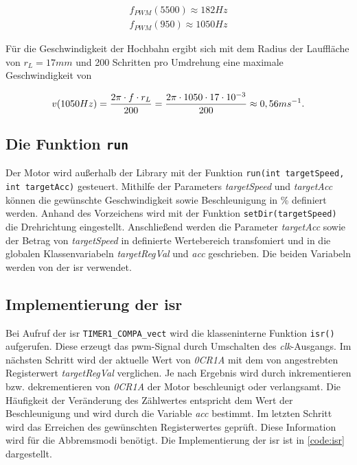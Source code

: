 \begin{align}
	f_{PWM}(5500) \approx 182 Hz \\
	f_{PWM}(950) \approx 1050 Hz
\end{align}


Für die Geschwindigkeit der Hochbahn ergibt sich mit dem Radius der Lauffläche von $r_L=17mm$ und 200 Schritten pro Umdrehung eine maximale Geschwindigkeit von

\begin{equation}
	v(1050Hz) = \frac{2\pi \cdot f \cdot r_L}{200} \\
	= \frac{2\pi \cdot 1050 \cdot 17 \cdot 10^{-3}}{200} \\
	\approx 0,56 ms^{-1}.
\end{equation}

\subsection{Die Funktion \texttt{run}}
\label{sec:run}	

Der Motor wird außerhalb der Library mit der Funktion \texttt{run(int targetSpeed, int targetAcc)} gesteuert. Mithilfe der Parameters \textit{targetSpeed} und \textit{targetAcc} können die gewünschte Geschwindigkeit sowie Beschleunigung in \% definiert werden. Anhand des Vorzeichens wird mit der Funktion \texttt{setDir(targetSpeed)} die Drehrichtung eingestellt. Anschließend werden die Parameter \textit{targetAcc} sowie der Betrag von \textit{targetSpeed} in definierte Wertebereich transfomiert und in die globalen Klassenvariabeln \textit{targetRegVal} und \textit{acc} geschrieben. 
Die beiden Variabeln werden von der \acrshort{isr} verwendet. 

\subsection{Implementierung der \acrshort{isr}}
\label{sec:isr}	
Bei Aufruf der \acrshort{isr} \texttt{TIMER1\_COMPA\_vect} wird die klasseninterne Funktion \texttt{isr()} aufgerufen. Diese erzeugt das \acrshort{pwm}-Signal durch Umschalten des \textit{clk}-Ausgangs. 
Im nächsten Schritt wird der aktuelle Wert von \textit{0CR1A} mit dem von angestrebten Registerwert \textit{targetRegVal} verglichen. Je nach Ergebnis wird durch inkrementieren bzw. dekrementieren von \textit{0CR1A} der Motor beschleunigt oder verlangsamt. Die Häufigkeit der Veränderung des Zählwertes entspricht dem Wert der Beschleunigung und wird durch die Variable \textit{acc} bestimmt. 
Im letzten Schritt wird das Erreichen des gewünschten Registerwertes geprüft. Diese Information wird für die Abbremsmodi benötigt. Die Implementierung der \acrshort{isr} ist in \autoref{code:isr} dargestellt. 

